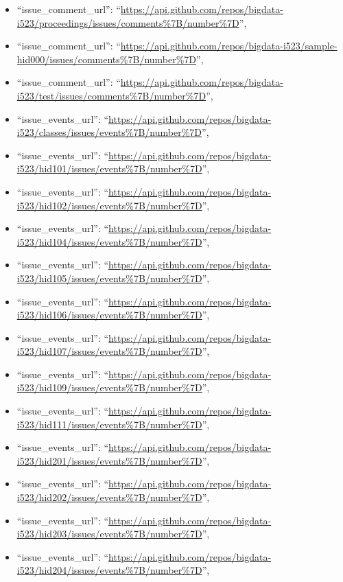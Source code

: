 \begin{itemize}
\item
  ``issue\_comment\_url'':
  ``\url{https://api.github.com/repos/bigdata-i523/proceedings/issues/comments\%7B/number\%7D}'',
\item
  ``issue\_comment\_url'':
  ``\url{https://api.github.com/repos/bigdata-i523/sample-hid000/issues/comments\%7B/number\%7D}'',
\item
  ``issue\_comment\_url'':
  ``\url{https://api.github.com/repos/bigdata-i523/test/issues/comments\%7B/number\%7D}'',
\item
  ``issue\_events\_url'':
  ``\url{https://api.github.com/repos/bigdata-i523/classes/issues/events\%7B/number\%7D}'',
\item
  ``issue\_events\_url'':
  ``\url{https://api.github.com/repos/bigdata-i523/hid101/issues/events\%7B/number\%7D}'',
\item
  ``issue\_events\_url'':
  ``\url{https://api.github.com/repos/bigdata-i523/hid102/issues/events\%7B/number\%7D}'',
\item
  ``issue\_events\_url'':
  ``\url{https://api.github.com/repos/bigdata-i523/hid104/issues/events\%7B/number\%7D}'',
\item
  ``issue\_events\_url'':
  ``\url{https://api.github.com/repos/bigdata-i523/hid105/issues/events\%7B/number\%7D}'',
\item
  ``issue\_events\_url'':
  ``\url{https://api.github.com/repos/bigdata-i523/hid106/issues/events\%7B/number\%7D}'',
\item
  ``issue\_events\_url'':
  ``\url{https://api.github.com/repos/bigdata-i523/hid107/issues/events\%7B/number\%7D}'',
\item
  ``issue\_events\_url'':
  ``\url{https://api.github.com/repos/bigdata-i523/hid109/issues/events\%7B/number\%7D}'',
\item
  ``issue\_events\_url'':
  ``\url{https://api.github.com/repos/bigdata-i523/hid111/issues/events\%7B/number\%7D}'',
\item
  ``issue\_events\_url'':
  ``\url{https://api.github.com/repos/bigdata-i523/hid201/issues/events\%7B/number\%7D}'',
\item
  ``issue\_events\_url'':
  ``\url{https://api.github.com/repos/bigdata-i523/hid202/issues/events\%7B/number\%7D}'',
\item
  ``issue\_events\_url'':
  ``\url{https://api.github.com/repos/bigdata-i523/hid203/issues/events\%7B/number\%7D}'',
\item
  ``issue\_events\_url'':
  ``\url{https://api.github.com/repos/bigdata-i523/hid204/issues/events\%7B/number\%7D}'',

\end{itemize}
